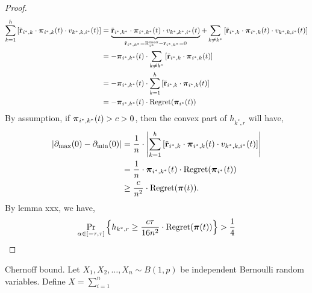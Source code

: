 \documentclass[10pt]{article}
\DeclareMathOperator*{\probability}{Pr}
\begin{document}
\begin{proof}
\begin{equation*}
\begin{split}
	\sum\limits_{k=1}^{h}{ \left[ {\tilde{\mathbf{r}}}_{i^*,k} \cdot {\boldsymbol{\pi}}_{i^*,k}(t) \cdot v_{k^*,k,i^*}(t) \right] } &= \underbrace{{\tilde{\mathbf{r}}}_{i^*,k^*} \cdot {\boldsymbol{\pi}}_{i^*,k^*}(t) \cdot v_{k^*,k^*,i^*}(t)}_{{\tilde{\mathbf{r}}}_{i^*,k^*} = {\text{R}}_{i^*}^{\max} -  {\mathbf{r}}_{i^*,k^*} = 0} + \sum\limits_{k\not=k^*}{ \left[ {\tilde{\mathbf{r}}}_{i^*,k} \cdot {\boldsymbol{\pi}}_{i^*,k}(t) \cdot v_{k^*,k,i^*}(t) \right] } \\
	&= - {\boldsymbol{\pi}}_{i^*,k^*}(t) \cdot \sum\limits_{k\not=k^*}{ \left[ {\tilde{\mathbf{r}}}_{i^*,k} \cdot {\boldsymbol{\pi}}_{i^*,k}(t) \right] } \\
	&= - {\boldsymbol{\pi}}_{i^*,k^*}(t) \cdot \sum\limits_{k=1}^{h}{ \left[ {\tilde{\mathbf{r}}}_{i^*,k} \cdot {\boldsymbol{\pi}}_{i^*,k}(t) \right] } \\
	&= - {\boldsymbol{\pi}}_{i^*,k^*}(t) \cdot {\text{Regret}}({\boldsymbol{\pi}}_{i^*}(t))
\end{split}
\end{equation*}
By assumption, if ${\boldsymbol{\pi}}_{i^*,k^*}(t) > c > 0$, then the convex part of $h_{k^*,r}$ will have,
\begin{equation*}
\begin{split}
	\left| \partial_{\max}{(0)} - \partial_{\min}{(0)} \right| &= \frac{1}{n} \cdot \left| \sum\limits_{k=1}^{h}{ \left[ {\tilde{\mathbf{r}}}_{i^*,k} \cdot {\boldsymbol{\pi}}_{i^*,k}(t) \cdot v_{k^*,k,i^*}(t) \right] } \right| \\
	&= \frac{1}{n} \cdot {\boldsymbol{\pi}}_{i^*,k^*}(t) \cdot {\text{Regret}}({\boldsymbol{\pi}}_{i^*}(t)) \\
	&\ge \frac{c}{n^2} \cdot {\text{Regret}}({\boldsymbol{\pi}}(t)).
\end{split}
\end{equation*}
By lemma xxx, we have,
\begin{equation*}
\begin{split}
	\probability\limits_{\alpha \in [-\tau, \tau]}\left\{ h_{k^*,r} \ge \frac{c\tau}{16n^2} \cdot \regret(\rvpi(t)) \right\} > \frac{1}{4}
\end{split}
\end{equation*}

\end{proof}

Chernoff bound. Let $X_1, X_2, \dots, X_n \sim B(1, p)$ be independent Bernoulli random variables. Define $X = \sum\limits_{i=1}^{n}{  }$

\begin{equation*}
\begin{split}
\end{split}
\end{equation*}
\end{document}
